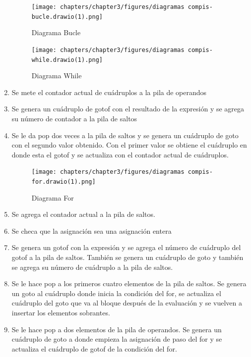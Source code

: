 \begin{enumerate}
    
    \begin{figure}[!htbp]
            \centering
            \texttt{[image: chapters/chapter3/figures/diagramas compis-bucle.drawio(1).png]}
            \caption{Diagrama Bucle}
            \label{fig:my_label}
    \end{figure}
    \FloatBarrier
    
    \begin{figure}[!htbp]
            \centering
            \texttt{[image: chapters/chapter3/figures/diagramas compis-while.drawio(1).png]}
            \caption{Diagrama While}
            \label{fig:my_label}
    \end{figure}
    \FloatBarrier
    
    \item Se mete el contador actual de cuádruplos a la pila de operandos
    \item Se genera un cuádruplo de gotof con el resultado de la expresión y se agrega su número de contador a la pila de saltos
    \item Se le da pop dos veces a la pila de saltos y se genera un cuádruplo de goto con el segundo valor obtenido. Con el primer valor se obtiene el cuádruplo en donde esta el gotof y se actualiza con el contador actual de cuádruplos.
    
    \newpage
    \begin{figure}[!htbp]
            \centering
            \texttt{[image: chapters/chapter3/figures/diagramas compis-for.drawio(1).png]}
            \caption{Diagrama For}
            \label{fig:my_label}
    \end{figure}
    \FloatBarrier
    
    \item Se agrega el contador actual a la pila de saltos.
    \item Se checa que la asignación sea una asignación entera
    \item Se genera un gotof con la expresión y se agrega el número de cuádruplo del gotof a la pila de saltos. También se genera un cuádruplo de goto y también se agrega su número de cuádruplo a la pila de saltos.
    \item Se le hace pop a los primeros cuatro elementos de la pila de saltos. Se genera un goto al cuádruplo donde inicia la condición del for, se actualiza el cuádruplo del goto que va al bloque después de la evaluación y se vuelven a insertar los elementos sobrantes.
    \item Se le hace pop a dos elementos de la pila de operandos. Se genera un cuádruplo de goto a donde empieza la asignación de paso del for y se actualiza el cuádruplo de gotof de la condición del for.
    

\end{enumerate}

